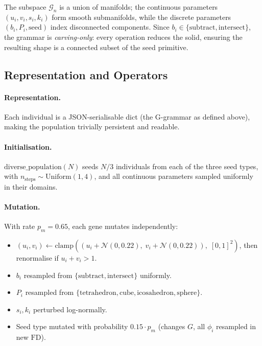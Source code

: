 \documentclass[11pt, a4paper]{article}
\newcommand{\FD}{\mathrm{FD}}
\begin{document}
The subspace $\mathcal{G}_n$ is a union of manifolds; the continuous parameters
$(u_i, v_i, s_i, k_i)$ form smooth submanifolds, while the discrete
parameters $(b_i, P_i, \mathrm{seed})$ index disconnected components.
Since $b_i \in \{\mathrm{subtract}, \mathrm{intersect}\}$, the grammar is
\emph{carving-only}: every operation reduces the solid, ensuring the
resulting shape is a connected subset of the seed primitive.

\subsection{Representation and Operators}

\paragraph{Representation.}
Each individual is a JSON-serialisable dict (the G-grammar as defined above),
making the population trivially persistent and readable.

\paragraph{Initialisation.}
$\mathrm{diverse\_population}(N)$ seeds $N/3$ individuals from each of the
three seed types, with $n_{\mathrm{steps}} \sim \mathrm{Uniform}(1,4)$,
and all continuous parameters sampled uniformly in their domains.

\paragraph{Mutation.}
With rate $p_m = 0.65$, each gene mutates independently:
\begin{itemize}
  \item $(u_i, v_i) \leftarrow \mathrm{clamp}((u_i + \mathcal{N}(0, 0.22),\; v_i + \mathcal{N}(0, 0.22)),\; [0,1]^2)$, then renormalise if $u_i + v_i > 1$.
  \item $b_i$ resampled from $\{\mathrm{subtract, intersect}\}$ uniformly.
  \item $P_i$ resampled from $\{\mathrm{tetrahedron, cube, icosahedron, sphere}\}$.
  \item $s_i, k_i$ perturbed log-normally.
  \item Seed type mutated with probability $0.15 \cdot p_m$ (changes $G$, all $\phi_i$ resampled in new $\FD$).
\end{itemize}
\end{document}
